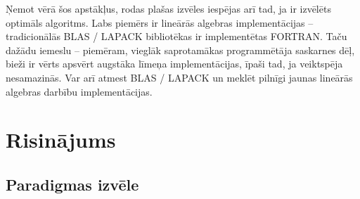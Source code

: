 \documentclass{ludis}
\begin{document}
Ņemot vērā šos apstākļus, rodas plašas izvēles iespējas arī tad, ja ir izvēlēts optimāls algoritms. Labs piemērs ir lineārās algebras implementācijas -- tradicionālās BLAS / LAPACK bibliotēkas ir implementētas FORTRAN. Taču dažādu iemeslu -- piemēram, vieglāk saprotamākas programmētāja saskarnes dēļ, bieži ir vērts apsvērt augstāka līmeņa implementācijas, īpaši tad, ja veiktspēja nesamazinās. Var arī atmest BLAS / LAPACK un meklēt pilnīgi jaunas lineārās algebras darbību implementācijas.

\chapter{Risinājums}
\section{Paradigmas izvēle}


\end{document}

